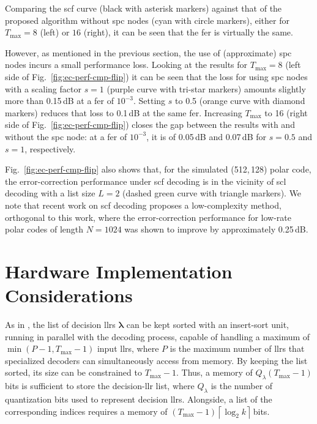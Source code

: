 \documentclass[conference]{IEEEtran}
\newcommand{\mvec}[1]{\bm{#1}}
\begin{document}
Comparing the \gls{scf} curve (black with asterisk markers) against that of the proposed algorithm without \gls{spc} nodes (cyan with circle markers), either for $T_{\max}=8$ (left) or $16$ (right), it can be seen that the \gls{fer} is virtually the same. 

However, as mentioned in the previous section, the use of (approximate) \gls{spc} nodes incurs a small performance loss. Looking at the results for $T_{\max}=8$ (left side of Fig.~\ref{fig:ec-perf-cmp-flip}) it can be seen that the loss for using \gls{spc} nodes with a scaling factor $s=1$ (purple curve with tri-star markers) amounts slightly more than 0.15\,dB at a \gls{fer} of $10^{-3}$. Setting $s$ to 0.5 (orange curve with diamond markers) reduces that loss to 0.1\,dB at the same \gls{fer}. Increasing $T_{\max}$ to 16 (right side of Fig.~\ref{fig:ec-perf-cmp-flip}) closes the gap between the results with and without the \gls{spc} node: at a \gls{fer} of $10^{-3}$, it is of 0.05\,dB and 0.07\,dB for $s=0.5$ and $s=1$, respectively.

Fig.~\ref{fig:ec-perf-cmp-flip} also shows that, for the simulated (512,\,128) polar code, the error-correction performance under \gls{scf} decoding is in the vicinity of \gls{scl} decoding with a list size $L=2$ (dashed green curve with triangle markers). We note that recent work on \gls{scf} decoding \cite{Condo_WCNC_2018} proposes a low-complexity method, orthogonal to this work, where the error-correction performance for low-rate polar codes of length $N=1024$ was shown to improve by approximately 0.25\,dB.

\section{Hardware Implementation Considerations}\label{sec:hw}
As in \cite{Giard_JETCAS_2017}, the list of decision \glspl{llr} $\mvec{\lambda}$ can be kept sorted with an insert-sort unit, running in parallel with the decoding process, capable of handling a maximum of $\min(P-1,T_{\max}-1)$ input \glspl{llr}, where $P$ is the maximum number of \glspl{llr} that specialized decoders can simultaneously access from memory. By keeping the list sorted, its size can be constrained to $T_{\max}-1$. Thus, a memory of $Q_{\lambda}(T_{\max}-1)$ bits is sufficient to store the decision-\gls{llr} list, where $Q_{\lambda}$ is the number of quantization bits used to represent decision \glspl{llr}. Alongside, a list of the corresponding indices requires a memory of $(T_{\max}-1)\left\lceil\log_2k\right\rceil$\,bits.
\end{document}

